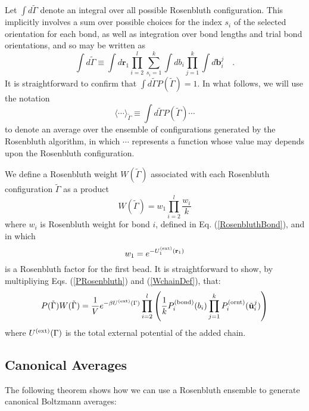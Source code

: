 \documentclass[12pt]{article} %
\newcommand{\vv}[1]{\mathbf{#1}}
\newcommand\chain{\Gamma}
\newcommand\Uext{U^{({\rm ext})}}
\newcommand\vbead{\vv{r}}
\newcommand\qbead{\vv{r}_{1}}
\newcommand\nbead{l}
\newcommand\vbond{\vv{b}}
\newcommand\rbond{b}
\newcommand\ntrial{k}
\newcommand\utrial{\tilde{\vv{u}}}
\newcommand\Pbond{P^{({\rm bond})}}
\newcommand\Pornt{P^{({\rm ornt})}}
\newcommand\rconfig{\tilde{\chain}}
\begin{document}
Let $\int d\rconfig$ denote an integral over all possible Rosenbluth configuration. 
This implicitly involves a sum over possible choices for the index $s_{i}$ of the 
selected orientation for each bond, as well as integration over bond lengths and 
trial bond orientations, and so may be written as
\begin{equation}
    \int d\rconfig \equiv 
                   \int d\qbead
                   \prod_{i=2}^{\nbead} 
                   \sum_{s_{i}=1}^{\ntrial} 
                   \int d\rbond_{i}
                   \prod_{j=1}^{\ntrial}
                   \int d\vbond_{i}^{j}
                   \quad.
\end{equation}
It is straightforward to confirm that $\int d\rconfig P(\rconfig) = 1$. In
what follows, we will use the notation
\begin{equation}
   \langle \cdots \rangle_{\rconfig} \equiv
   \int d\rconfig P(\rconfig) \cdots
\end{equation}
to denote an average over the ensemble of configurations generated by the
Rosenbluth algorithm, in which $\cdots$ represents a function whose value
may depends upon the Rosenbluth configuration. 

We define a Rosenbluth weight $W(\rconfig)$ associated with each Rosenbluth 
configuration $\rconfig$ as a product
\begin{equation}
   W(\rconfig) = w_{1} \prod_{i=2}^{\nbead} \frac{w_{i}}{k}
   \label{WchainDef}
\end{equation}
where $w_{i}$ is Rosenbluth weight for bond $i$, defined in Eq. (\ref{RosenbluthBond}), and in which
\begin{equation}
   w_{1} = e^{-\Uext_{1}(\vbead_{1})} 
\end{equation}
is a Rosenbluth factor for the first bead. It is straightforward to show, by multipliying Eqs. (\ref{PRosenbluth}) and (\ref{WchainDef}), that: 
\begin{equation}
   P(\rconfig)W(\rconfig) 
   = \frac{1}{V} e^{-\beta\Uext(\chain)}
                 \prod_{i=2}^{\nbead} \left (
                 \frac{1}{k}
                 \Pbond_{i}(\rbond_{i})
                 \prod_{j=1}^{\ntrial}
                 \Pornt_{i}(\utrial_{i}^{j}) \right )
   \label{PWRosenbluthProduct}
\end{equation}
where $\Uext(\chain)$ is the total external potential of the added chain.

\subsection{Canonical Averages}
The following theorem shows how we can use a Rosenbluth ensemble to generate
canonical Boltzmann averages:
\end{document}
